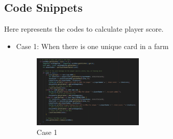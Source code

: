 \documentclass[conference]{IEEEtran}
\begin{document}
\subsection{Code Snippets}
Here represents the codes to calculate player score.
\begin{itemize}
    \item Case 1: When there is one unique card in a farm
    \begin{figure}[h!]
        \centering
        \includegraphics[width=0.5\textwidth]{img/Screenshot 2025-01-14 125602.png} %
        \caption{Case 1}
        \label{fig:case}
    \end{figure}


\end{itemize}
\end{document}
